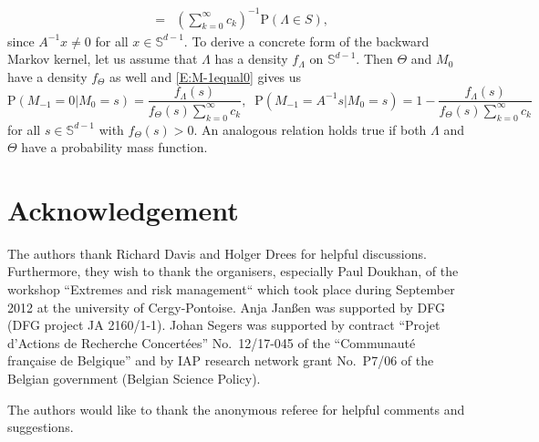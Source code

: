 \documentclass{aptpubarxiv}
\numberwithin{equation}{section}
\begin{document}
\begin{ex}
\begin{eqnarray}
\label{E:M-1equal0}&=&(\sum_{k=0}^\infty c_k)^{-1}{\mathrm{P}}(\Lambda \in S),
\end{eqnarray}
since $A^{-1}x \neq 0$ for all $x \in \mathbb{S}^{d-1}$.
To derive a concrete form of the backward Markov kernel, let us assume that $\Lambda$ has a density $f_\Lambda$ on $\mathbb{S}^{d-1}$. Then $\Theta$ and $M_0$ have a density $f_\Theta$ as well and \eqref{E:M-1equal0} gives us
$$ {\mathrm{P}}(M_{-1}=0|M_0=s)=\frac{f_\Lambda(s)}{f_\Theta(s)\sum_{k=0}^\infty c_k}, \;\; {\mathrm{P}}(M_{-1}=A^{-1}s|M_0=s)=1-\frac{f_\Lambda(s)}{f_\Theta(s)\sum_{k=0}^\infty c_k}$$
for all $s \in \mathbb{S}^{d-1}$ with $f_\Theta(s)>0$.
An analogous relation holds true if both $\Lambda$ and $\Theta$ have a probability mass function. 
\fi
\end{ex}

\section*{Acknowledgement} 
The authors thank Richard Davis and Holger Drees for helpful discussions. Furthermore, they wish to thank the organisers, especially Paul Doukhan, of the workshop ``Extremes and risk management`` which took place during September 2012 at the university of Cergy-Pontoise. Anja Jan\ss en was supported by DFG (DFG project JA 2160/1-1). Johan Segers was supported by contract ``Projet d'Actions de Recherche Concert\'ees'' No.\ 12/17-045 of the ``Communaut\'e fran\c{c}aise de Belgique'' and by IAP research network grant No.\ P7/06 of the Belgian government (Belgian Science Policy).

The authors would like to thank the anonymous referee for helpful comments and suggestions. 
\end{document}
